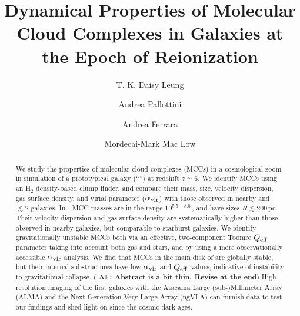 \IfFileExists{emulateapjlegacy.cls}{\documentclass[iop]{emulateapjlegacy}}{\documentclass[iop]{emulateapj}}
\newcommand{\AF}[1]{({\bf \color{afcolor} AF: #1})}
\begin{document}
\title{Dynamical Properties of Molecular Cloud Complexes in Galaxies at the Epoch of Reionization}

\author{T. K. Daisy Leung}
\author{Andrea Pallottini}
\author{Andrea Ferrara}
\author{Mordecai-Mark Mac Low}


\begin{abstract}
We study the properties of molecular cloud complexes (MCCs) in a cosmological zoom-in simulation of a
prototypical galaxy (``\flower'') at redshift $z\simeq 6$.
%
We identify MCCs using an H$_2$ density-based clump finder, and compare their mass, size, velocity dispersion, gas surface density, and virial parameter ($\alpha_{\rm vir}$) with those observed in nearby and \z$\lesssim 2$ galaxies.
%
In \flower, MCC masses are in the range $10^{5.5-8.5}$\,\Msun, and have sizes $R\lesssim200$\,pc. Their velocity dispersion and gas surface density are systematically higher than those observed in nearby galaxies, but comparable to starburst galaxies.
%
We identify gravitationally unstable MCCs both via an effective, two-component Toomre $Q_{\rm eff}$ parameter
    taking into account both gas and stars,
and by using a more observationally accessible $\alpha_{\rm vir}$ analysis. We find that MCCs in the main disk of \flower are globally stable, but their internal substructures have low $\alpha_{\rm vir}$ and $Q_{\rm eff}$ values, indicative of
    instability to gravitational
collapse.
%
\AF{Abstract is a bit thin. Revise at the end}
High resolution imaging of the first galaxies with the Atacama Large (sub-)Millimeter Array (ALMA) and the Next Generation Very Large Array (ngVLA) can furnish
data to test our findings and shed light on \SF since the cosmic dark ages.
\end{abstract}
\end{document}
